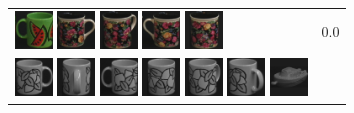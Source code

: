 \begin{figure}[tbp]
\begin{center}
\begin{tabular}{m{11cm} | m{3cm} |}
\includegraphics[width=1cm]{coil/beeld-31.eps}
\includegraphics[width=1cm]{coil/beeld-60.eps}
\includegraphics[width=1cm]{coil/beeld-63.eps}
\includegraphics[width=1cm]{coil/beeld-61.eps}
\includegraphics[width=1cm]{coil/beeld-62.eps}
& {\scriptsize 0.0}
\\
\includegraphics[width=1cm]{coil/beeld-48.eps}
\includegraphics[width=1cm]{coil/beeld-50.eps}
\includegraphics[width=1cm]{coil/beeld-51.eps}
\includegraphics[width=1cm]{coil/beeld-52.eps}
\includegraphics[width=1cm]{coil/beeld-53.eps}
\includegraphics[width=1cm]{coil/beeld-49.eps}
\includegraphics[width=1cm]{coil/beeld-29.eps}

\end{tabular}
\end{center}
\end{figure}
